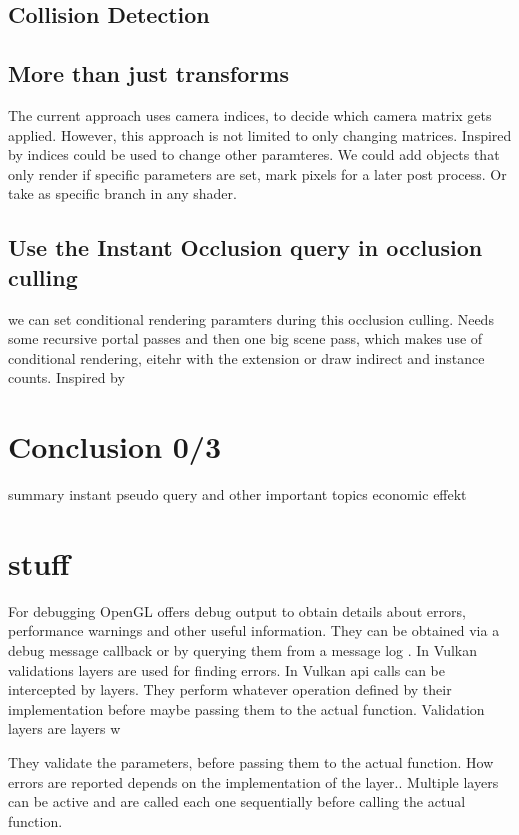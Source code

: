 \subsection{Collision Detection}

\subsection{More than just transforms}
\label{more than transforms}
The current approach uses camera indices, to decide which camera matrix gets applied. However, this approach is not limited to only changing matrices. Inspired by \cite{borst:2009:real} indices could be used to change other paramteres. We could add objects that only render if specific parameters are set, mark pixels for a later post process. Or take as specific branch in any shader.


\subsection{Use the Instant Occlusion query in occlusion culling}
we can set conditional rendering paramters during this occlusion culling.
Needs some  recursive portal passes and then one big scene pass, which makes use of conditional rendering, eitehr with the extension or draw indirect and instance counts. Inspired by \cite{yang:2014:walkthrough}

\section{Conclusion 0/3}

summary
instant pseudo query and other important topics
economic effekt

\section*{stuff}
For debugging OpenGL offers debug output to obtain details about errors, performance warnings and other useful information. They can be obtained via a debug message callback or by querying them from a message log \cite{khronos:openGL:spec4.6}. In Vulkan validations layers are used for finding errors. In Vulkan \gls{api} calls can be intercepted by layers. They perform whatever operation defined by their implementation before maybe passing them to the actual function. Validation layers are layers w

They validate the parameters, before passing them to the actual function. How errors are reported depends on the implementation of the layer.. Multiple layers can be active and are called each one sequentially before calling the actual function. \cite{khronos:vulkan:spec1.1}












